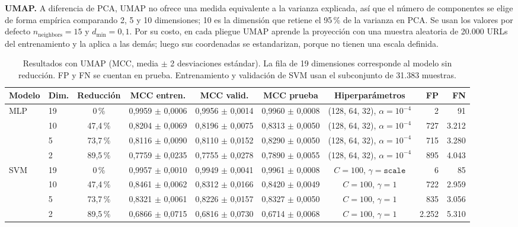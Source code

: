 \documentclass[journal]{IEEEtran}
\begin{document}
\textbf{UMAP.} A diferencia de PCA, UMAP no ofrece una medida equivalente a la varianza explicada,
así que el número de componentes se elige de forma empírica comparando 2, 5 y 10 dimensiones; 10 es
la dimensión que retiene el 95\,\% de la varianza en PCA. Se usan los valores por defecto
$n_{\text{neighbors}}=15$ y $d_{\min}=0{,}1$. Por su costo, en cada pliegue UMAP aprende la proyección
con una muestra aleatoria de 20.000 URLs del entrenamiento y la aplica a las demás; luego sus
coordenadas se estandarizan, porque no tienen una escala definida.

\begin{table}[t]
\centering
\caption{Resultados con UMAP (MCC, media $\pm$ 2 desviaciones estándar). La fila de 19 dimensiones
corresponde al modelo sin reducción. FP y FN se cuentan en prueba. Entrenamiento y validación de SVM
usan el subconjunto de 31.383 muestras.}
\label{tab:umap}
\small
\begin{tabular}{llcccccrr}
\toprule
\textbf{Modelo} & \textbf{Dim.} & \textbf{Reducción} & \textbf{MCC entren.} & \textbf{MCC valid.} &
\textbf{MCC prueba} & \textbf{Hiperparámetros} & \textbf{FP} & \textbf{FN} \\
\midrule
MLP & 19 & 0\,\% & 0,9959 $\pm$ 0,0006 & 0,9956 $\pm$ 0,0014 & 0,9960 $\pm$ 0,0008 & (128, 64, 32), $\alpha=10^{-4}$ & 2 & 91 \\
    & 10 & 47,4\,\% & 0,8204 $\pm$ 0,0069 & 0,8196 $\pm$ 0,0075 & 0,8313 $\pm$ 0,0050 & (128, 64, 32), $\alpha=10^{-4}$ & 727 & 3.212 \\
    & 5 & 73,7\,\% & 0,8116 $\pm$ 0,0090 & 0,8110 $\pm$ 0,0152 & 0,8290 $\pm$ 0,0050 & (128, 64, 32), $\alpha=10^{-4}$ & 715 & 3.280 \\
    & 2 & 89,5\,\% & 0,7759 $\pm$ 0,0235 & 0,7755 $\pm$ 0,0278 & 0,7890 $\pm$ 0,0055 & (128, 64, 32), $\alpha=10^{-4}$ & 895 & 4.043 \\
\midrule
SVM & 19 & 0\,\% & 0,9957 $\pm$ 0,0010 & 0,9949 $\pm$ 0,0041 & 0,9961 $\pm$ 0,0008 & $C=100$, $\gamma=\texttt{scale}$ & 6 & 85 \\
    & 10 & 47,4\,\% & 0,8461 $\pm$ 0,0062 & 0,8312 $\pm$ 0,0166 & 0,8420 $\pm$ 0,0049 & $C=100$, $\gamma=1$ & 722 & 2.959 \\
    & 5 & 73,7\,\% & 0,8321 $\pm$ 0,0061 & 0,8226 $\pm$ 0,0157 & 0,8327 $\pm$ 0,0050 & $C=100$, $\gamma=1$ & 835 & 3.056 \\
    & 2 & 89,5\,\% & 0,6866 $\pm$ 0,0715 & 0,6816 $\pm$ 0,0730 & 0,6714 $\pm$ 0,0068 & $C=100$, $\gamma=1$ & 2.252 & 5.310 \\
\bottomrule
\end{tabular}
\end{table}
\end{document}
